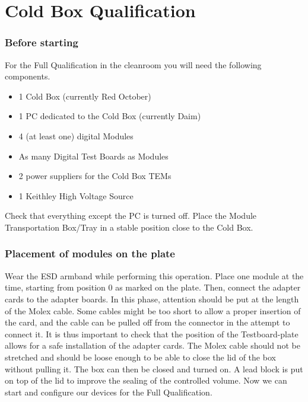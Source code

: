 \documentclass[fleqn,10pt]{SelfArx} %
\date{\today}
\begin{document}
\flushbottom %

\maketitle %

\tableofcontents %

\thispagestyle{empty} %

\newpage
\part{Cold Box Qualification}
\section{Before starting}
For the Full Qualification in the cleanroom you will need the following components.
\begin{itemize}
\item 1 Cold Box (currently Red October)
\item 1 PC dedicated to the Cold Box (currently Daim)
\item 4 (at least one) digital Modules
\item As many Digital Test Boards as Modules
\item 2 power suppliers for the Cold Box TEMs 
\item 1 Keithley High Voltage Source
\end{itemize}
Check that everything except the PC is turned off. Place the Module Transportation Box/Tray in a stable position close to the Cold Box.


\section{Placement of modules on the plate}
Wear the ESD armband while performing this operation. Place one module at the time, starting from position 0 as marked on the plate. Then, connect the adapter cards to the adapter boards. In this phase, attention should be put at the length of the Molex cable. Some cables might be too short to allow a proper insertion of the card, and the cable can be pulled off from the connector in the attempt to connect it. It is thus important to check that the position of the Testboard-plate allows for a safe installation of the adapter cards. The Molex cable should not be stretched and should be loose enough to be able to close the lid of the box without pulling it. The box can then be closed and turned on. A lead block is put on top of the lid to improve the sealing of the controlled volume. Now we can start and configure our devices for the Full Qualification.
\end{document}
